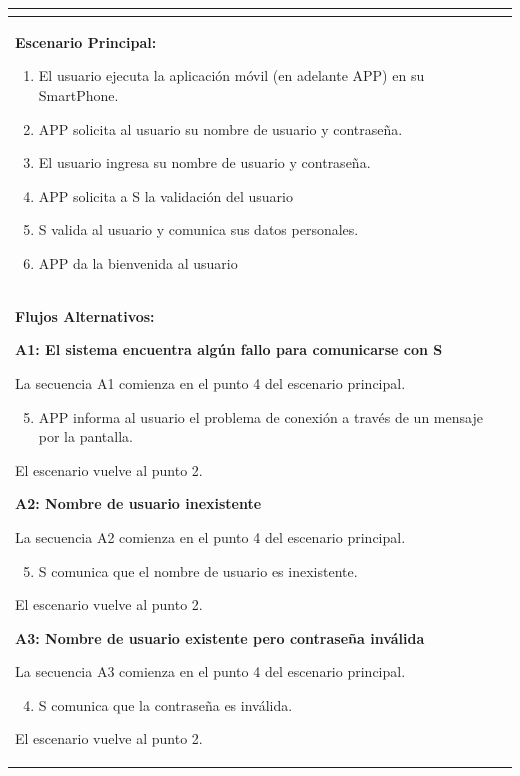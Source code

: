 \begin{longtable}{|l|p{5.5cm}|l|p{2cm}|l|p{1.9cm}|}
{    } \\ \hline

    \multicolumn{6}{|p{15cm}|}{ \textbf{Escenario Principal: }

    \begin{enumerate}
        \item El usuario ejecuta la aplicación móvil (en adelante APP) en su SmartPhone.
        \item APP solicita al usuario su nombre de usuario y contraseña.
        \item El usuario ingresa su nombre de usuario y contraseña.
        \item APP solicita a S la validación del usuario
        \item S valida al usuario y comunica sus datos personales.
        \item APP da la bienvenida al usuario
    \end{enumerate}

    } \\ \hline

    \multicolumn{6}{|p{15cm}|}{ \textbf{Flujos Alternativos: }

    \textbf{A1: El sistema encuentra algún fallo para comunicarse con S}
    
    La secuencia A1 comienza en el punto 4 del escenario principal.
    \begin{enumerate}
        \setcounter{enumi}{4}
        \item APP informa al usuario el problema de conexión a través de un mensaje por la pantalla.
    \end{enumerate}

    El escenario vuelve al punto 2.

    \textbf{A2: Nombre de usuario inexistente}
    
    La secuencia A2 comienza en el punto 4 del escenario principal.
    \begin{enumerate}
        \setcounter{enumi}{4}
        \item S comunica que el nombre de usuario es inexistente.
    \end{enumerate}

    El escenario vuelve al punto 2.

    \textbf{A3: Nombre de usuario existente pero contraseña inválida}
    
    La secuencia A3 comienza en el punto 4 del escenario principal.
    \begin{enumerate}
        \setcounter{enumi}{3}
        \item S comunica que la contraseña es inválida.
    \end{enumerate}

    El escenario vuelve al punto 2.

    } \\ \hline

\end{longtable}

